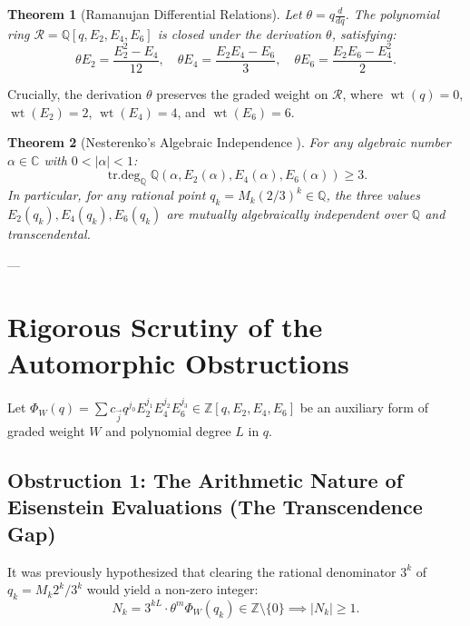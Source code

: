\documentclass[11pt,reqno]{amsart}
\newtheorem{theorem}{Theorem}[section]
\theoremstyle{definition}
\numberwithin{equation}{section}
\begin{document}
\begin{theorem}[Ramanujan Differential Relations]
Let $\theta = q \frac{d}{dq}$. The polynomial ring $\mathcal{R} = \mathbb{Q}[q, E_2, E_4, E_6]$ is closed under the derivation $\theta$, satisfying:
\begin{equation}
\label{eq:ramanujan}
\theta E_2 = \frac{E_2^2 - E_4}{12}, \quad \theta E_4 = \frac{E_2 E_4 - E_6}{3}, \quad \theta E_6 = \frac{E_2 E_6 - E_4^2}{2}.
\end{equation}
\end{theorem}

Crucially, the derivation $\theta$ preserves the graded weight on $\mathcal{R}$, where $\operatorname{wt}(q) = 0$, $\operatorname{wt}(E_2) = 2$, $\operatorname{wt}(E_4) = 4$, and $\operatorname{wt}(E_6) = 6$.

\begin{theorem}[Nesterenko's Algebraic Independence \cite{nesterenko1996}]
For any algebraic number $\alpha \in \mathbb{C}$ with $0 < |\alpha| < 1$:
\begin{equation}
\operatorname{tr.deg}_\mathbb{Q} \mathbb{Q}(\alpha, E_2(\alpha), E_4(\alpha), E_6(\alpha)) \ge 3.
\end{equation}
In particular, for any rational point $q_k = M_k (2/3)^k \in \mathbb{Q}$, the three values $E_2(q_k), E_4(q_k), E_6(q_k)$ are mutually algebraically independent over $\mathbb{Q}$ and transcendental.
\end{theorem}

---

\section{Rigorous Scrutiny of the Automorphic Obstructions}

Let $\Phi_W(q) = \sum c_{\vec{j}} q^{j_0} E_2^{j_1} E_4^{j_2} E_6^{j_3} \in \mathbb{Z}[q, E_2, E_4, E_6]$ be an auxiliary form of graded weight $W$ and polynomial degree $L$ in $q$. 

\subsection{Obstruction 1: The Arithmetic Nature of Eisenstein Evaluations (The Transcendence Gap)}
It was previously hypothesized that clearing the rational denominator $3^k$ of $q_k = M_k 2^k / 3^k$ would yield a non-zero integer:
\begin{equation}
N_k = 3^{k L} \cdot \theta^m \Phi_W(q_k) \in \mathbb{Z} \setminus \{0\} \implies |N_k| \ge 1.
\end{equation}
\end{document}
